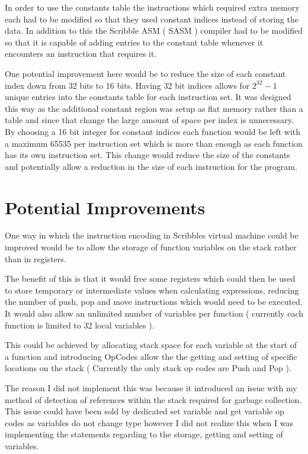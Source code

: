 \documentclass[]{final_report}
\begin{document}
In order to use the constants table the instructions which required extra memory each had to be modified so that they used constant indices instead of storing the data. In addition to this the Scribble ASM ( SASM ) compiler had to be modified so that it is capable of adding entries to the constant table whenever it encounters an instruction that requires it.

One potential improvement here would be to reduce the size of each constant index down from 32 bits to 16 bits. Having 32 bit indices allows for \begin{math}2^{32} - 1\end{math} unique entries into the constants table for each instruction set. It was designed this way as the additional constant region was setup as flat memory rather than a table and since that change the large amount of space per index is unnecessary. By choosing a 16 bit integer for constant indices each function would be left with a maximum 65535 per instruction set which is more than enough as each function has its own instruction set. This change would reduce the size of the constants and potentially allow a reduction in the size of each instruction for the program.

\section{Potential Improvements}

One way in which the instruction encoding in Scribbles virtual machine could be improved would be to allow the storage of function variables on the stack rather than in registers.

The benefit of this is that it would free some registers which could then be used to store temporary or intermediate values when calculating expressions, reducing the number of push, pop and move instructions which would need to be executed. It would also allow an unlimited number of variables per function ( currently each function is limited to 32 local variables ).

This could be achieved by allocating stack space for each variable at the start of a function and introducing OpCodes allow the the getting and setting of specific locations on the stack ( Currently the only stack op codes are Push and Pop ).

The reason I did not implement this was because it introduced an issue with my method of detection of references within the stack required for garbage collection. This issue could have been sold by dedicated set variable and get variable op codes as variables do not change type however I did not realize this when I was implementing the statements regarding to the storage, getting and setting of variables.
\end{document}

